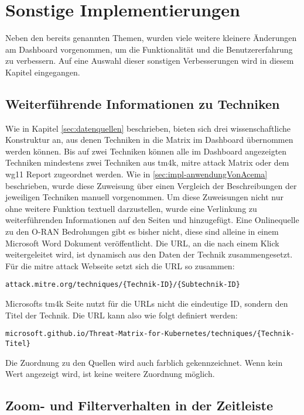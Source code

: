 \section{Sonstige Implementierungen}
Neben den bereits genannten Themen, wurden viele weitere kleinere Änderungen am Dashboard vorgenommen, um die Funktionalität und die Benutzererfahrung zu verbessern. Auf eine Auswahl dieser sonstigen Verbesserungen wird in diesem Kapitel eingegangen.
\subsection{Weiterführende Informationen zu Techniken}
\par Wie in Kapitel \ref{sec:datenquellen} beschrieben, bieten sich drei wissenschaftliche Konstruktur an, aus denen Techniken in die Matrix im Dashboard übernommen werden können. Bis auf zwei Techniken können alle im Dashboard angezeigten Techniken mindestens zwei Techniken aus \gls{tm4k}, \gls{mitre} \gls{attack} Matrix oder dem \gls{wg11} Report zugeordnet werden. Wie in \ref{sec:impl-anwendungVonAcema} beschrieben, wurde diese Zuweisung über einen Vergleich der Beschreibungen der jeweiligen Techniken manuell vorgenommen.
Um diese Zuweisungen nicht nur ohne weitere Funktion textuell darzustellen, wurde eine Verlinkung zu weiterführenden Informationen auf den Seiten \autocite{MITREATTCK} und \autocite{TacticsThreatMatrix} hinzugefügt. Eine Onlinequelle zu den O-RAN Bedrohungen gibt es bisher nicht, diese sind alleine in einem Microsoft Word Dokument veröffentlicht. Die URL, an die nach einem Klick weitergeleitet wird, ist dynamisch aus den Daten der Technik zusammengesetzt. Für die \gls{mitre} \gls{attack} Webseite setzt sich die URL so zusammen: \par \verb|attack.mitre.org/techniques/{Technik-ID}/{Subtechnik-ID}|
\par Microsofts \gls{tm4k} Seite nutzt für die URLs nicht die eindeutige ID, sondern den Titel der Technik. Die URL kann also wie folgt definiert werden: \par \verb|microsoft.github.io/Threat-Matrix-for-Kubernetes/techniques/{Technik-Titel}|
\par Die Zuordnung zu den Quellen wird auch farblich gekennzeichnet. Wenn kein Wert angezeigt wird, ist keine weitere Zuordnung möglich.
\subsection{Zoom- und Filterverhalten in der Zeitleiste}

